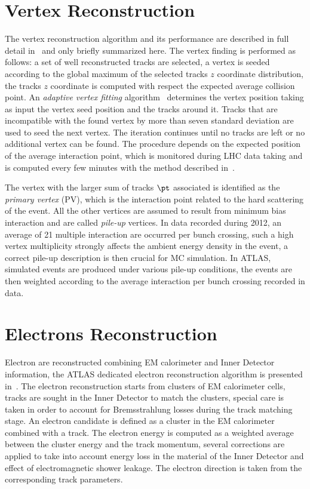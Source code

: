 \section{Vertex Reconstruction}
The vertex reconstruction algorithm and its performance are described in full detail in~\cite{AtlasCSCBook,VertexPerf} and
only briefly summarized here.
The vertex finding is performed as follows:  a set of well reconstructed tracks are selected,
a vertex is seeded according to the global maximum of the selected tracks $z$ coordinate distribution, the tracks $z$ coordinate 
is computed with respect the expected average collision point. 
An \emph{adaptive vertex fitting} algorithm~\cite{Vertex} determines the vertex position taking as input the vertex seed position and the 
tracks around it. Tracks that are incompatible with the found vertex by more than seven standard deviation
are used to seed the next vertex. The iteration continues until no tracks are left or no additional vertex can be found.
The procedure depends  on the expected position of the average interaction point, which is monitored 
during LHC data taking and is computed every few minutes with the method described in~\cite{beamspot}.

The vertex with the larger sum of tracks $\pt$ associated is identified as the \emph{primary vertex} (PV), 
which is the interaction point related to the hard scattering of the event. All the other vertices are assumed to result from
minimum bias interaction and are called \emph{pile-up} vertices.
In data recorded during 2012, an average of 21 multiple interaction are occurred per bunch crossing,
such a high vertex multiplicity strongly affects the ambient energy density in the event, 
a correct pile-up description is then crucial for MC simulation. In ATLAS, simulated events are produced under
various pile-up conditions, the events are then weighted according to the average interaction
per bunch crossing recorded in data.


\section{Electrons Reconstruction} \label{sec:elec}
Electron are reconstructed combining EM calorimeter and Inner Detector information,
the ATLAS dedicated electron reconstruction algorithm is presented in~\cite{electronAlgo}.
The electron reconstruction starts from clusters of EM calorimeter cells, 
tracks are sought in the Inner Detector to match the clusters, special care is taken in order to account for 
Bremsstrahlung losses during the track matching stage. 
An electron candidate is defined as a cluster in the EM calorimeter combined with a track.
The electron energy is computed as 
a weighted average between the cluster energy and the track momentum, several corrections are applied to
take into account energy loss in the material of the Inner Detector and effect of electromagnetic shower 
leakage. The electron direction is taken from the corresponding track parameters. 

